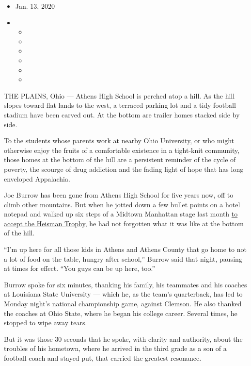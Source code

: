 \begin{itemize}
\item
  Jan. 13, 2020
\item
  \begin{itemize}
  \item
  \item
  \item
  \item
  \item
  \item
  \end{itemize}
\end{itemize}

THE PLAINS, Ohio --- Athens High School is perched atop a hill. As the
hill slopes toward flat lands to the west, a terraced parking lot and a
tidy football stadium have been carved out. At the bottom are trailer
homes stacked side by side.

To the students whose parents work at nearby Ohio University, or who
might otherwise enjoy the fruits of a comfortable existence in a
tight-knit community, those homes at the bottom of the hill are a
persistent reminder of the cycle of poverty, the scourge of drug
addiction and the fading light of hope that has long enveloped
Appalachia.

Joe Burrow has been gone from Athens High School for five years now, off
to climb other mountains. But when he jotted down a few bullet points on
a hotel notepad and walked up six steps of a Midtown Manhattan stage
last month
\href{https://www.nytimes3xbfgragh.onion/2019/12/14/sports/heisman-trophy-joe-burrow.html?action=click\&module=RelatedLinks\&pgtype=Article}{to
accept the Heisman Trophy}, he had not forgotten what it was like at the
bottom of the hill.

``I'm up here for all those kids in Athens and Athens County that go
home to not a lot of food on the table, hungry after school,'' Burrow
said that night, pausing at times for effect. ``You guys can be up here,
too.''

Burrow spoke for six minutes, thanking his family, his teammates and his
coaches at Louisiana State University --- which he, as the team's
quarterback, has led to Monday night's national championship game,
against Clemson. He also thanked the coaches at Ohio State, where he
began his college career. Several times, he stopped to wipe away tears.

But it was those 30 seconds that he spoke, with clarity and authority,
about the troubles of his hometown, where he arrived in the third grade
as a son of a football coach and stayed put, that carried the greatest
resonance.

